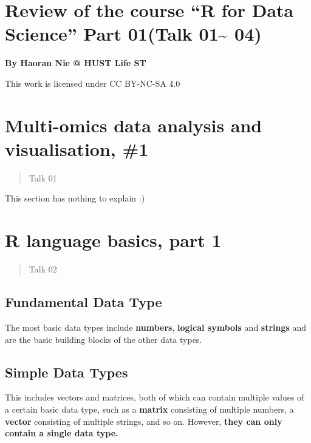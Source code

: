 \documentclass[
]{article}
\author{}
\date{}
\begin{document}
\hypertarget{review-of-the-course-r-for-data-science-part-01talk-01-04}{%
\section{Review of the course ``R for Data Science'' Part 01(Talk
01\textasciitilde{}
04)}\label{review-of-the-course-r-for-data-science-part-01talk-01-04}}

\textbf{By Haoran Nie @ HUST Life ST}

This work is licensed under CC BY-NC-SA 4.0

\tableofcontents

\newpage
{}
\hypertarget{multi-omics-data-analysis-and-visualisation-1}{%
\section{Multi-omics data analysis and visualisation,
\#1}\label{multi-omics-data-analysis-and-visualisation-1}}

\begin{quote}
Talk 01
\end{quote}

This section has nothing to explain :)

\hypertarget{r-language-basics-part-1}{%
\section{R language basics, part 1}\label{r-language-basics-part-1}}

\begin{quote}
Talk 02
\end{quote}

\hypertarget{fundamental-data-type}{%
\subsection{Fundamental Data Type}\label{fundamental-data-type}}

The most basic data types include \textbf{numbers}, \textbf{logical
symbols} and \textbf{strings} and are the basic building blocks of the
other data types.

\hypertarget{simple-data-types}{%
\subsection{Simple Data Types}\label{simple-data-types}}

This includes vectors and matrices, both of which can contain multiple
values of a certain basic data type, such as a \textbf{matrix}
consisting of multiple numbers, a \textbf{vector} consisting of multiple
strings, and so on. However, \textbf{they can only contain a single data
type.}
\end{document}
